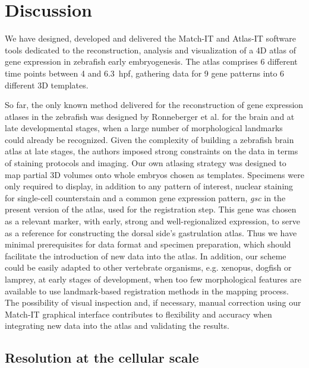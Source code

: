 \section*{Discussion}



We have designed, developed and delivered the Match-IT and Atlas-IT software tools dedicated to the reconstruction, analysis and visualization of a 4D atlas of gene expression in zebrafish early embryogenesis. The atlas comprises 6 different time points between 4 and 6.3~hpf, gathering data for 9 gene patterns into 6 different 3D templates.



So far, the only known method delivered for the reconstruction of gene expression atlases in the zebrafish was designed by Ronneberger et al.\cite{ronneberger2012vibe} for the brain and at late developmental stages, when a large number of morphological landmarks could already be recognized. Given the complexity of building a zebrafish brain atlas at late stages, the authors imposed strong constraints on the data in terms of staining protocols and imaging. Our own atlasing strategy was designed to map partial 3D volumes onto whole embryos chosen as templates.  Specimens were only required to display, in addition to any pattern of interest, nuclear staining for single-cell counterstain and a common gene expression pattern, \emph{gsc} in the present version of the atlas, used for the registration step. This gene was chosen as a relevant marker, with early, strong and well-regionalized expression, to serve as a reference for constructing the dorsal side's gastrulation atlas. Thus we have minimal prerequisites for data format and specimen preparation, which should facilitate the introduction of new data into the atlas. In addition, our scheme could be easily adapted to other vertebrate organisms, e.g. xenopus, dogfish or lamprey, at early stages of development, when too few morphological features are available to use landmark-based registration methods in the mapping process. The possibility of visual inspection and, if necessary, manual correction using our Match-IT graphical interface contributes to flexibility and accuracy when integrating new data into the atlas and validating the results.



\subsection*{Resolution at the cellular scale}



